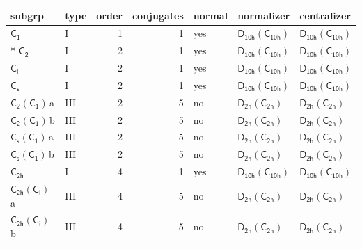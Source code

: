\documentclass[10pt,a4paper]{article}
\numberwithin{equation}{section}
\newcommand{\grp}[1]{\mathsf{#1}}
\newcommand{\clsletter}[1]{\,{\scriptsize\color{black!55}#1}}
\begin{document}
{\small\begin{longtable}{@{}llrrlll@{}}\toprule
subgrp & type & order & conjugates & normal & normalizer & centralizer\\\midrule\endhead
\bottomrule\endfoot\endlastfoot
\href{../../../rotation/data/pdf/C1.pdf}{$\grp{C_{1}}$} & I & 1 & 1 & yes & \href{D10h-C10h.pdf}{$\grp{D_{10h}}(\grp{C_{10h}})$} & \href{D10h-C10h.pdf}{$\grp{D_{10h}}(\grp{C_{10h}})$}\\*
\href{../../../rotation/data/pdf/C2.pdf}{$\grp{C_{2}}$} & I & 2 & 1 & yes & \href{D10h-C10h.pdf}{$\grp{D_{10h}}(\grp{C_{10h}})$} & \href{D10h-C10h.pdf}{$\grp{D_{10h}}(\grp{C_{10h}})$}\\
\href{../../../rotation/data/pdf/S2.pdf}{$\grp{C_{i}}$} & I & 2 & 1 & yes & \href{D10h-C10h.pdf}{$\grp{D_{10h}}(\grp{C_{10h}})$} & \href{D10h-C10h.pdf}{$\grp{D_{10h}}(\grp{C_{10h}})$}\\
\href{../../../rotation/data/pdf/C1v.pdf}{$\grp{C_{s}}$} & I & 2 & 1 & yes & \href{D10h-C10h.pdf}{$\grp{D_{10h}}(\grp{C_{10h}})$} & \href{D10h-C10h.pdf}{$\grp{D_{10h}}(\grp{C_{10h}})$}\\
\href{C2-C1.pdf}{$\grp{C_{2}}(\grp{C_{1}})$}\clsletter{a} & III & 2 & 5 & no & \href{D2h-C2h.pdf}{$\grp{D_{2h}}(\grp{C_{2h}})$} & \href{D2h-C2h.pdf}{$\grp{D_{2h}}(\grp{C_{2h}})$}\\
\href{C2-C1.pdf}{$\grp{C_{2}}(\grp{C_{1}})$}\clsletter{b} & III & 2 & 5 & no & \href{D2h-C2h.pdf}{$\grp{D_{2h}}(\grp{C_{2h}})$} & \href{D2h-C2h.pdf}{$\grp{D_{2h}}(\grp{C_{2h}})$}\\
\href{C1v-C1.pdf}{$\grp{C_{s}}(\grp{C_{1}})$}\clsletter{a} & III & 2 & 5 & no & \href{D2h-C2h.pdf}{$\grp{D_{2h}}(\grp{C_{2h}})$} & \href{D2h-C2h.pdf}{$\grp{D_{2h}}(\grp{C_{2h}})$}\\
\href{C1v-C1.pdf}{$\grp{C_{s}}(\grp{C_{1}})$}\clsletter{b} & III & 2 & 5 & no & \href{D2h-C2h.pdf}{$\grp{D_{2h}}(\grp{C_{2h}})$} & \href{D2h-C2h.pdf}{$\grp{D_{2h}}(\grp{C_{2h}})$}\\
\href{../../../rotation/data/pdf/C2h.pdf}{$\grp{C_{2h}}$} & I & 4 & 1 & yes & \href{D10h-C10h.pdf}{$\grp{D_{10h}}(\grp{C_{10h}})$} & \href{D10h-C10h.pdf}{$\grp{D_{10h}}(\grp{C_{10h}})$}\\
\href{C2h-S2.pdf}{$\grp{C_{2h}}(\grp{C_{i}})$}\clsletter{a} & III & 4 & 5 & no & \href{D2h-C2h.pdf}{$\grp{D_{2h}}(\grp{C_{2h}})$} & \href{D2h-C2h.pdf}{$\grp{D_{2h}}(\grp{C_{2h}})$}\\
\href{C2h-S2.pdf}{$\grp{C_{2h}}(\grp{C_{i}})$}\clsletter{b} & III & 4 & 5 & no & \href{D2h-C2h.pdf}{$\grp{D_{2h}}(\grp{C_{2h}})$} & \href{D2h-C2h.pdf}{$\grp{D_{2h}}(\grp{C_{2h}})$}\\

\end{longtable}}
\end{document}
